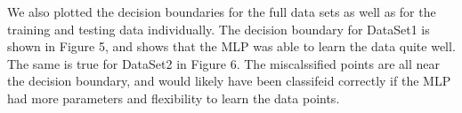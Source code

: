 \documentclass[letterpaper, 12pt]{article}
\begin{document}
We also plotted the decision boundaries for the full data sets as well as for the training and testing data individually. The decision boundary for DataSet1 is shown in Figure 5, and shows that the MLP was able to learn the data quite well. The same is true for DataSet2 in Figure 6. The miscalssified points are all near the decision boundary, and would likely have been classifeid correctly if the MLP had more parameters and flexibility to learn the data points.
\end{document}
